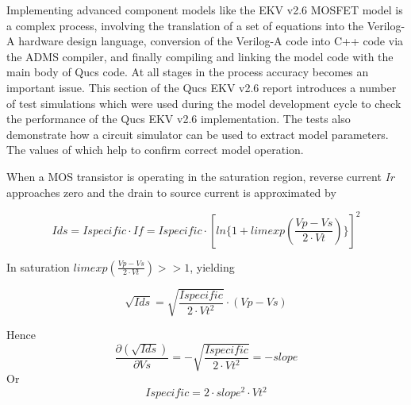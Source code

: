 Implementing advanced component models like the EKV v2.6 MOSFET model
is a complex process, involving the translation of a set of equations
into the Verilog-A hardware design language, conversion of the
Verilog-A code into C++ code via the ADMS compiler, and finally
compiling and linking the model code with the main body of Qucs
code. At all stages in the process accuracy becomes an important
issue. This section of the Qucs EKV v2.6 report introduces a number of
test simulations which were used during the model development cycle to
check the performance of the Qucs EKV v2.6 implementation.  The tests
also demonstrate how a circuit simulator can be used to extract model
parameters. The values of which help to confirm correct model
operation.


When a MOS transistor is operating in the saturation region, reverse
current \textit{Ir} approaches zero and the drain to source current is
approximated by

\hspace{20mm}     \begin{equation}
              Ids = Ispecific \cdot If = Ispecific \cdot \left[ ln\lbrace  1+limexp\left( \dfrac{Vp-Vs}{2 \cdot Vt} \right) \rbrace  \right]^{2} 
                  \end{equation}  



In saturation $limexp\left( \frac{Vp-Vs}{2 \cdot Vt} \right) >> 1$,
yielding

\hspace{20mm}     \begin{equation}
			\sqrt{Ids} = \sqrt{\dfrac{Ispecific}{2 \cdot Vt^{2}}} \cdot \left( Vp-Vs\right) 
                  \end{equation}  

Hence   
\hspace{20mm}     \begin{equation}
			\dfrac{\partial(\sqrt{Ids})}{\partial Vs} = -\sqrt{\dfrac{Ispecific}{2 \cdot Vt^{2}}} = -slope
                  \end{equation}  
Or 
\hspace{20mm}     \begin{equation}
			Ispecific = 2 \cdot slope^{2} \cdot Vt^{2}
                  \end{equation}  

